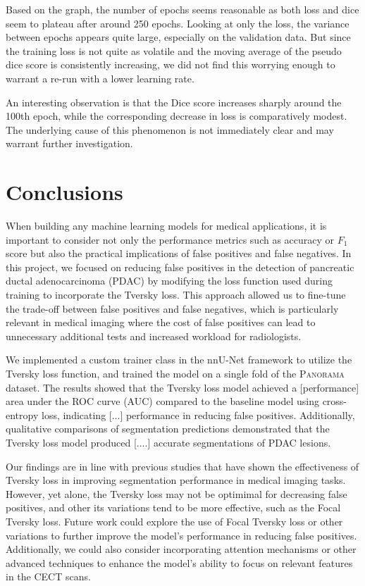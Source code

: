 \documentclass[conference]{IEEEtran}
\begin{document}
Based on the graph, the number of epochs seems reasonable as both loss and dice seem to plateau after around 250 epochs. Looking at only the loss, the variance between epochs appears quite large, especially on the validation data. But since the training loss is not quite as volatile and the moving average of the pseudo dice score is consistently increasing, we did not find this worrying enough to warrant a re-run with a lower learning rate.

An interesting observation is that the Dice score increases sharply around the 100th epoch, while the corresponding decrease in loss is comparatively modest. The underlying cause of this phenomenon is not immediately clear and may warrant further investigation.

\section{Conclusions}
When building any machine learning models for medical applications, it is important to consider not only the performance metrics such as accuracy or $F_1$ score but also the practical implications of false positives and false negatives. In this project, we focused on reducing false positives in the detection of pancreatic ductal adenocarcinoma (PDAC) by modifying the loss function used during training to incorporate the Tversky loss. This approach allowed us to fine-tune the trade-off between false positives and false negatives, which is particularly relevant in medical imaging where the cost of false positives can lead to unnecessary additional tests and increased workload for radiologists.

We implemented a custom trainer class in the nnU-Net framework to utilize the Tversky loss function, and trained the model on a single fold of the \textsc{Panorama} dataset. The results showed that the Tversky loss model achieved a [performance] area under the ROC curve (AUC) compared to the baseline model using cross-entropy loss, indicating [...] performance in reducing false positives. Additionally, qualitative comparisons of segmentation predictions demonstrated that the Tversky loss model produced [....] accurate segmentations of PDAC lesions.

Our findings are in line with previous studies that have shown the effectiveness of Tversky loss in improving segmentation performance in medical imaging tasks. However, yet alone, the Tversky loss may not be optimimal for decreasing false positives, and other its variations tend to be more effective, such as the Focal Tversky loss\cite{b3}. Future work could explore the use of Focal Tversky loss or other variations to further improve the model's performance in reducing false positives. Additionally, we could also consider incorporating attention mechanisms or other advanced techniques to enhance the model's ability to focus on relevant features in the CECT scans.
\end{document}

